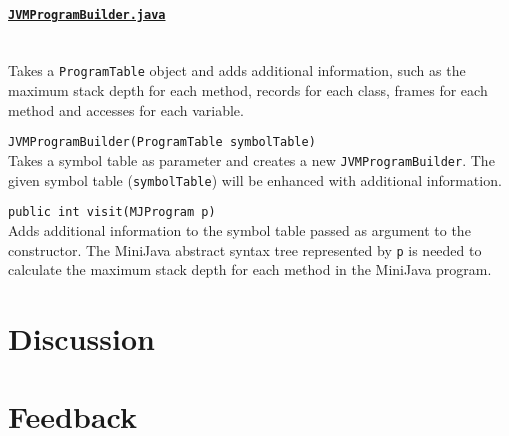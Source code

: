 \documentclass[11pt,oneside,a4paper]{article}
\newcommand{\code}[1]{\texttt{#1}}
\newcommand{\class}[1]{\underline{\texttt{#1}}}
\begin{document}
\paragraph{\class{JVMProgramBuilder.java}} \hfill \\
Takes a \code{ProgramTable} object and adds additional information, such as the
maximum stack depth for each method, records for each class, frames for each
method and accesses for each variable.
\label{par:JVMProgramBuilder}
\begin{description}
    \item{\code{JVMProgramBuilder(ProgramTable symbolTable)}} \hfill \\
        Takes a symbol table as parameter and creates a new
        \code{JVMProgramBuilder}. The given symbol table (\code{symbolTable})
        will be enhanced with additional information.
    \item{\code{public int visit(MJProgram p)}} \hfill \\
        Adds additional information to the symbol table passed as argument to
        the constructor. The MiniJava abstract syntax tree represented by
        \code{p} is needed to calculate the maximum stack depth for each method
        in the MiniJava program.
\end{description}

\section{Discussion}
\label{sec:discussion}

\appendix
\section{Feedback}
\end{document}
